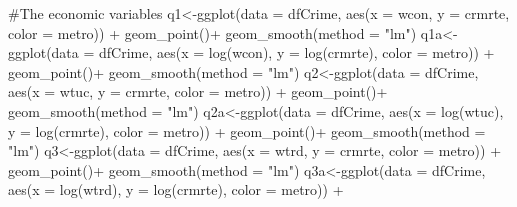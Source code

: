 \documentclass[]{article}
\newenvironment{Shaded}{}{}
\newcommand{\CommentTok}[1]{\textcolor[rgb]{0.00,0.50,0.00}{#1}}
\newcommand{\DataTypeTok}[1]{#1}
\newcommand{\KeywordTok}[1]{\textcolor[rgb]{0.00,0.00,1.00}{#1}}
\newcommand{\NormalTok}[1]{#1}
\newcommand{\OperatorTok}[1]{#1}
\newcommand{\StringTok}[1]{\textcolor[rgb]{0.00,0.50,0.50}{#1}}
\begin{document}
\begin{Shaded}
\begin{Highlighting}[]
\CommentTok{#The economic variables}
\NormalTok{q1<-}\KeywordTok{ggplot}\NormalTok{(}\DataTypeTok{data =}\NormalTok{ dfCrime, }\KeywordTok{aes}\NormalTok{(}\DataTypeTok{x =}\NormalTok{ wcon, }\DataTypeTok{y =}\NormalTok{ crmrte, }\DataTypeTok{color =}\NormalTok{ metro)) }\OperatorTok{+}\StringTok{ }
\StringTok{      }\KeywordTok{geom_point}\NormalTok{()}\OperatorTok{+}
\StringTok{  }\KeywordTok{geom_smooth}\NormalTok{(}\DataTypeTok{method =} \StringTok{"lm"}\NormalTok{)}
\NormalTok{q1a<-}\KeywordTok{ggplot}\NormalTok{(}\DataTypeTok{data =}\NormalTok{ dfCrime, }\KeywordTok{aes}\NormalTok{(}\DataTypeTok{x =} \KeywordTok{log}\NormalTok{(wcon), }\DataTypeTok{y =} \KeywordTok{log}\NormalTok{(crmrte), }\DataTypeTok{color =}\NormalTok{ metro)) }\OperatorTok{+}\StringTok{ }
\StringTok{      }\KeywordTok{geom_point}\NormalTok{()}\OperatorTok{+}
\StringTok{  }\KeywordTok{geom_smooth}\NormalTok{(}\DataTypeTok{method =} \StringTok{"lm"}\NormalTok{)}
\NormalTok{q2<-}\KeywordTok{ggplot}\NormalTok{(}\DataTypeTok{data =}\NormalTok{ dfCrime, }\KeywordTok{aes}\NormalTok{(}\DataTypeTok{x =}\NormalTok{ wtuc, }\DataTypeTok{y =}\NormalTok{ crmrte, }\DataTypeTok{color =}\NormalTok{ metro)) }\OperatorTok{+}\StringTok{ }
\StringTok{      }\KeywordTok{geom_point}\NormalTok{()}\OperatorTok{+}
\StringTok{  }\KeywordTok{geom_smooth}\NormalTok{(}\DataTypeTok{method =} \StringTok{"lm"}\NormalTok{)}
\NormalTok{q2a<-}\KeywordTok{ggplot}\NormalTok{(}\DataTypeTok{data =}\NormalTok{ dfCrime, }\KeywordTok{aes}\NormalTok{(}\DataTypeTok{x =} \KeywordTok{log}\NormalTok{(wtuc), }\DataTypeTok{y =} \KeywordTok{log}\NormalTok{(crmrte), }\DataTypeTok{color =}\NormalTok{ metro)) }\OperatorTok{+}\StringTok{ }
\StringTok{      }\KeywordTok{geom_point}\NormalTok{()}\OperatorTok{+}
\StringTok{  }\KeywordTok{geom_smooth}\NormalTok{(}\DataTypeTok{method =} \StringTok{"lm"}\NormalTok{)}
\NormalTok{q3<-}\KeywordTok{ggplot}\NormalTok{(}\DataTypeTok{data =}\NormalTok{ dfCrime, }\KeywordTok{aes}\NormalTok{(}\DataTypeTok{x =}\NormalTok{ wtrd, }\DataTypeTok{y =}\NormalTok{ crmrte, }\DataTypeTok{color =}\NormalTok{ metro)) }\OperatorTok{+}\StringTok{ }
\StringTok{      }\KeywordTok{geom_point}\NormalTok{()}\OperatorTok{+}
\StringTok{  }\KeywordTok{geom_smooth}\NormalTok{(}\DataTypeTok{method =} \StringTok{"lm"}\NormalTok{)}
\NormalTok{q3a<-}\KeywordTok{ggplot}\NormalTok{(}\DataTypeTok{data =}\NormalTok{ dfCrime, }\KeywordTok{aes}\NormalTok{(}\DataTypeTok{x =} \KeywordTok{log}\NormalTok{(wtrd), }\DataTypeTok{y =} \KeywordTok{log}\NormalTok{(crmrte), }\DataTypeTok{color =}\NormalTok{ metro)) }\OperatorTok{+}\StringTok{ }

\end{Highlighting}
\end{Shaded}
\end{document}
